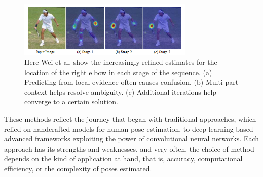     \begin{figure}[htbp]
        \centering
        \includegraphics[width=0.75\textwidth]{figures/convPose.png}
        \caption{Here Wei et al. show the increasingly refined estimates for the location of the right elbow in each stage of the sequence. (a) Predicting from local evidence often causes confusion. (b) Multi-part context helps resolve ambiguity. (c) Additional iterations help converge to a certain solution. \citep{wei2016convolutional}}
        \label{fig:convpose}
    \end{figure}
    
    These methods reflect the journey that began with traditional approaches, which relied on handcrafted models for human-pose estimation, to deep-learning-based advanced frameworks exploiting the power of convolutional neural networks. Each approach has its strengths and weaknesses, and very often, the choice of method depends on the kind of application at hand, that is, accuracy, computational efficiency, or the complexity of poses estimated.
    


